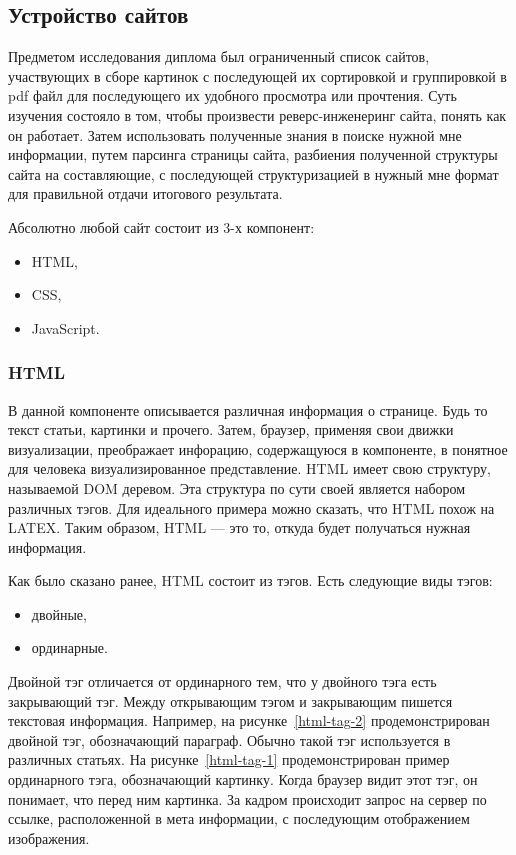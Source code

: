 \subsection{Устройство сайтов}
Предметом исследования диплома был ограниченный список сайтов,
участвующих в сборе картинок с последующей их сортировкой и группировкой в pdf файл для последующего их удобного просмотра или прочтения.
Суть изучения состояло в том, чтобы произвести реверс-инженеринг сайта, понять как он работает. 
Затем использовать полученные знания в поиске нужной мне информации, путем парсинга страницы сайта, разбиения полученной структуры сайта на составляющие,
с последующей структуризацией в нужный мне формат для правильной отдачи итогового результата.

Абсолютно любой сайт состоит из 3-х компонент:

\begin{itemize}
    \item HTML,
    \item CSS,
    \item JavaScript.
\end{itemize}  

\subsubsection{HTML}
В данной компоненте описывается различная информация о странице. Будь то текст статьи, картинки и прочего.
Затем, браузер, применяя свои движки визуализации, преображает инфорацию, содержащуюся в компоненте, в понятное для человека визуализированное представление.
HTML имеет свою структуру, называемой DOM деревом. Эта структура по сути своей является набором различных тэгов.
Для идеального примера можно сказать, что HTML похож на LATEX. Таким образом, HTML --- это то, откуда будет получаться нужная информация.

Как было сказано ранее, HTML состоит из тэгов. Есть следующие виды тэгов:
\begin{itemize}
    \item двойные,
    \item ординарные.
\end{itemize} 

Двойной тэг отличается от ординарного тем, что у двойного тэга есть закрывающий тэг. Между открывающим тэгом и закрывающим пишется текстовая информация.
Например, на рисунке~\ref{html-tag-2} продемонстрирован двойной тэг, обозначающий параграф. Обычно такой тэг используется в различных статьях.
На рисунке~\ref{html-tag-1} продемонстрирован пример ординарного тэга, обозначающий картинку. Когда браузер видит этот тэг, он понимает, что перед ним картинка.
За кадром происходит запрос на сервер по ссылке, расположенной в мета информации, с последующим отображением изображения.

